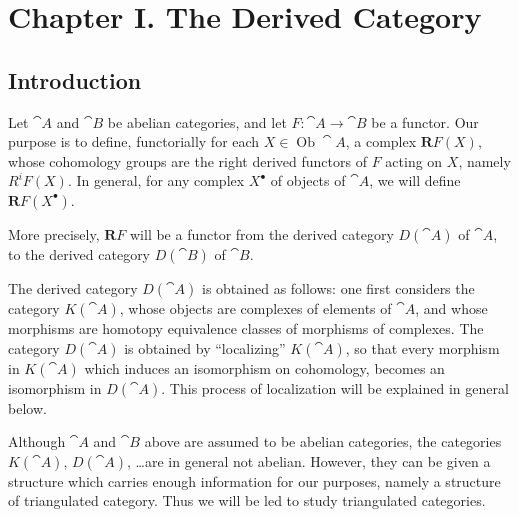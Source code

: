 \setcounter{page}{19}
\chapter*{Chapter I. The Derived Category}

\section*{Introduction}
Let \(\cat{A}\) and \(\cat{B}\) be abelian categories, and let \(F\colon \cat{A}\to\cat{B}\) be a functor. Our purpose is to define, functorially for each \(X\in\operatorname{Ob}\cat{A}\), a complex \(\mathbf{R}F(X)\), whose cohomology groups are the right derived functors of \(F\) acting on \(X\), namely \(R^i F(X)\). In general, for any complex \(X^\bullet\) of objects of \(\cat{A}\), we will define \(\mathbf{R}F(X^\bullet)\).

More precisely, \(\mathbf{R}F\) will be a functor from the derived category \(D(\cat{A})\) of \(\cat{A}\), to the derived category \(D(\cat{B})\) of \(\cat{B}\).

The derived category \(D(\cat{A})\) is obtained as follows: one first considers the category \(K(\cat{A})\), whose objects are complexes of elements of \(\cat{A}\), and whose morphisms are homotopy equivalence classes of morphisms of complexes. The category \(D(\cat{A})\) is obtained by ``localizing'' \(K(\cat{A})\), so that every morphism in \(K(\cat{A})\) which induces an isomorphism on cohomology, becomes an isomorphism in \(D(\cat{A})\). This process of localization will be explained in general below.

Although \(\cat{A}\) and \(\cat{B}\) above are assumed to be abelian categories, the categories \(K(\cat{A})\), \(D(\cat{A})\), \dots are in general not abelian. However, they can be given a structure which carries enough information for our purposes, namely a structure of triangulated category. Thus we will be led to study triangulated categories.
